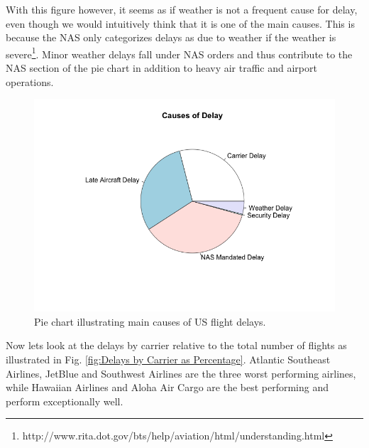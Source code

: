 \documentclass[11pt,twoside,titlepage]{article}
\begin{document}
With this figure however, it seems as if weather is not a frequent cause for delay, even though we would intuitively think that it is one of the main causes. This is because the NAS only categorizes delays as due to weather if the weather is severe\footnote{http://www.rita.dot.gov/bts/help/aviation/html/understanding.html}. Minor weather delays fall under NAS orders and thus contribute to the NAS section of the pie chart in addition to heavy air traffic and airport operations.

\begin{figure}[h!]
        \centering
                \includegraphics[width=16cm]{Pie.png}
        \caption{Pie chart illustrating main causes of US flight delays.}\label{fig:Pie}
\end{figure}

Now lets look at the delays by carrier relative to the total number of flights as illustrated in Fig. \ref{fig:Delays by Carrier as Percentage}. Atlantic Southeast Airlines, JetBlue and Southwest Airlines are the three worst performing airlines, while Hawaiian Airlines and Aloha Air Cargo are the best performing and perform exceptionally well.
\end{document}
